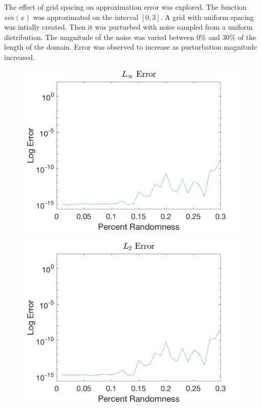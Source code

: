 \documentclass{article}
\begin{document}
The effect of grid spacing on approximation error was explored. The function $sin(x)$ was approximated on the interval $[0,3]$. A grid with uniform spacing was intially created. Then it was purturbed with noise sampled from a uniform distribution. The magnitude of the noise was varied between 0\% and 30\% of the length of the domain. Error was observed to increase as purturbation magnitude increased. 

\begin{figure}[H]
  \centering
  \begin{minipage}{.6\textwidth}
    \centering
    \includegraphics[width=\linewidth]{maxRandErr.png}
    \label{fig:max3}
  \end{minipage}%
  \begin{minipage}{.6\textwidth}
    \centering
    \includegraphics[width=\linewidth]{squareRandErr.png}
    \label{fig:square3}
  \end{minipage}%
\end{figure}
\end{document}
